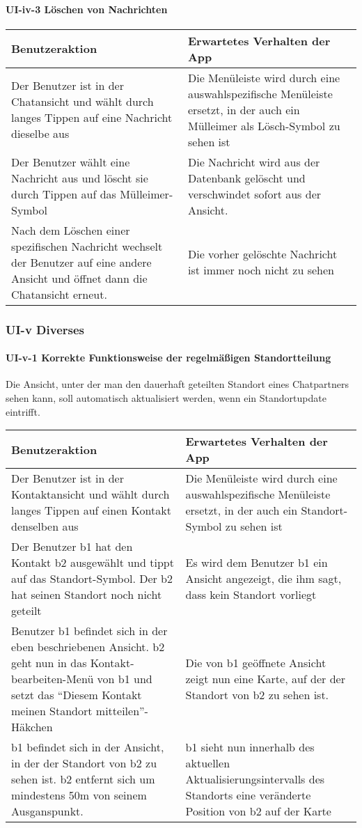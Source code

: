 \paragraph{UI-iv-3 Löschen von Nachrichten}

\begin{longtable}{|p{8cm}|p{8.5cm}|}
\hline
Benutzeraktion & Erwartetes Verhalten der App\tabularnewline
\hline

Der Benutzer ist in der Chatansicht und wählt durch langes Tippen auf
eine Nachricht dieselbe aus & Die Menüleiste wird durch eine
auswahlspezifische Menüleiste ersetzt, in der auch ein Mülleimer als
Lösch-Symbol zu sehen ist\tabularnewline
Der Benutzer wählt eine Nachricht aus und löscht sie durch Tippen auf
das Mülleimer-Symbol & Die Nachricht wird aus der Datenbank gelöscht und
verschwindet sofort aus der Ansicht.\tabularnewline
Nach dem Löschen einer spezifischen Nachricht wechselt der Benutzer auf
eine andere Ansicht und öffnet dann die Chatansicht erneut. & Die vorher
gelöschte Nachricht ist immer noch nicht zu sehen\tabularnewline
\hline
\end{longtable}



\clearpage
\subsubsection{UI-v Diverses}

\paragraph{UI-v-1 Korrekte Funktionsweise der regelmäßigen Standortteilung}

Die Ansicht, unter der man den dauerhaft geteilten Standort eines Chatpartners sehen kann, soll automatisch aktualisiert werden, wenn ein Standortupdate eintrifft.

\begin{longtable}{|p{8cm}|p{8.5cm}|}
\hline
Benutzeraktion & Erwartetes Verhalten der App\tabularnewline
\hline

Der Benutzer ist in der Kontaktansicht und wählt durch langes Tippen auf
einen Kontakt denselben aus & Die Menüleiste wird durch eine
auswahlspezifische Menüleiste ersetzt, in der auch ein Standort-Symbol
zu sehen ist\tabularnewline
Der Benutzer b1 hat den Kontakt b2 ausgewählt und tippt auf das
Standort-Symbol. Der b2 hat seinen Standort noch nicht geteilt & Es wird
dem Benutzer b1 ein Ansicht angezeigt, die ihm sagt, dass kein Standort
vorliegt\tabularnewline
Benutzer b1 befindet sich in der eben beschriebenen Ansicht. b2 geht nun
in das Kontakt-bearbeiten-Menü von b1 und setzt das ``Diesem Kontakt
meinen Standort mitteilen''-Häkchen & Die von b1 geöffnete Ansicht zeigt
nun eine Karte, auf der der Standort von b2 zu sehen ist.\tabularnewline
b1 befindet sich in der Ansicht, in der der Standort von b2 zu sehen
ist. b2 entfernt sich um mindestens 50m von seinem Ausganspunkt. & b1
sieht nun innerhalb des aktuellen Aktualisierungsintervalls des
Standorts eine veränderte Position von b2 auf der Karte\tabularnewline
\hline
\end{longtable}
